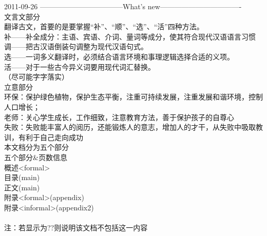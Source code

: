 2011-09-26
-----------------------------------What's new----------------------------------\\
文言文部分\\
翻译古文，首要的是要掌握“补”、“顺”、“选”、“活”四种方法。\\
补——补全成分：主语、宾语、介词、量词等成分，使其符合现代汉语语言习惯\\
调——把古汉语倒装句调整为现代汉语句式。\\
选——一词多义翻译时，必须结合语言环境和事理逻辑选择合适的义项。\\
活——对于一些古今异义词要用现代词汇替换。\\
（尽可能字字落实）
\\
立意部分\\
环保：保护绿色植物，保护生态平衡，注重可持续发展，注重发展和谐环境，控制人口增长；\\
老师：关心学生成长，工作细致，注意教育方法，善于保护孩子的自尊心\\
失败：失败能丰富人的阅历，还能锻炼人的意志，增加人的才干，从失败中吸取教训，有利于自己走向成功\\
本文档分为五个部分\\
五个部分\&页数信息\\
概述<formal>\pageref{abstractformal}\\
目录(main)\pageref{contents}\\
正文(main)\pageref{main}\\
附录<formal>(appendix)\pageref{appendixformal}\\
附录<informal>(appendix2)\pageref{appendixinformal}\\
\\
注：若显示为??则说明该文档不包括这一内容\label{appendixformal} \\
\\ 